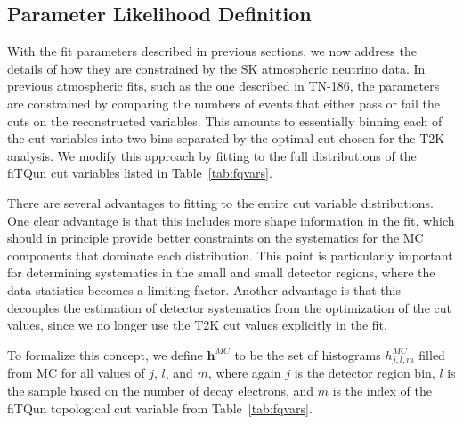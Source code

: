 \subsection{Parameter Likelihood Definition}
\label{subsec:parlike}

With the fit parameters described in previous sections, we now address the
details of how they are constrained by the SK atmospheric neutrino data.  In
previous atmospheric fits, such as the one described in TN-186, the parameters
are constrained by comparing the numbers of events that either pass or fail the
cuts on the reconstructed variables.  This amounts to essentially binning each
of the cut variables into two bins separated by the optimal cut chosen for the
T2K analysis.  We modify this approach by fitting to the full distributions
of the fiTQun cut variables listed in Table~\ref{tab:fqvars}.

There are several advantages to fitting to the entire cut variable
distributions.  One clear advantage is that this includes more shape
information in the fit, which should in principle provide better constraints on
the systematics for the MC components that dominate each distribution. This
point is particularly important for determining systematics in the small \wall
and small \towall detector regions, where the data statistics becomes a limiting
factor.  Another advantage is that this decouples the estimation of detector
systematics from the optimization of the cut values, since we no longer use the
T2K cut values explicitly in the fit.   

To formalize this concept, we define $\mathbf{h}^{MC}$ to be the set of
histograms $h^{MC}_{j,l,m}$ filled from MC for all values of $j$, $l$, and $m$,
where again $j$  is the detector region bin, $l$ is the sample based on the
number of decay electrons, and $m$ is the index of the fiTQun topological cut
variable from Table~\ref{tab:fqvars}.

